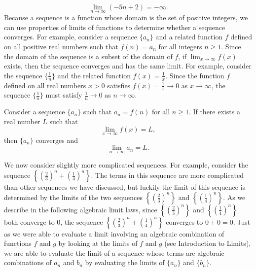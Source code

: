 \documentclass{report}
\begin{document}
    \[
    \lim_{{n \to \infty}} (-5n+2) = -\infty.
    \]
    \bigbreak \noindent 
    Because a sequence is a function whose domain is the set of positive integers, we can use properties of limits of functions to determine whether a sequence converges. For example, consider a sequence \( \{a_n\} \) and a related function \( f \) defined on all positive real numbers such that \( f(n) = a_n \) for all integers \( n \geq 1 \). Since the domain of the sequence is a subset of the domain of \( f \), if \( \lim_{{x \to \infty}} f(x) \) exists, then the sequence converges and has the same limit. For example, consider the sequence \( \{\frac{1}{n}\} \) and the related function \( f(x) = \frac{1}{x} \). Since the function \( f \) defined on all real numbers \( x > 0 \) satisfies \( f(x) = \frac{1}{x} \to 0 \) as \( x \to \infty \), the sequence \( \{\frac{1}{n}\} \) must satisfy \( \frac{1}{n} \to 0 \) as \( n \to \infty \).

    \bigbreak \noindent 
    \begin{thrm}
        Consider a sequence \( \{a_n\} \) such that \( a_n = f(n) \) for all \( n \geq 1 \). If there exists a real number \( L \) such that
        \[
        \lim_{{x \to \infty}} f(x) = L,
        \]
        then \( \{a_n\} \) converges and
        \[
        \lim_{{n \to \infty}} a_n = L.
        \]

        
    \end{thrm}

    \bigbreak \noindent 
      We now consider slightly more complicated sequences. For example, consider the sequence \( \left\{\left(\frac{2}{3}\right)^n + \left(\frac{1}{4}\right)^n\right\} \). The terms in this sequence are more complicated than other sequences we have discussed, but luckily the limit of this sequence is determined by the limits of the two sequences \( \left\{\left(\frac{2}{3}\right)^n\right\} \) and \( \left\{\left(\frac{1}{4}\right)^n\right\} \). As we describe in the following algebraic limit laws, since \( \left\{\left(\frac{2}{3}\right)^n\right\} \) and \( \left\{\left(\frac{1}{4}\right)^n\right\} \) both converge to 0, the sequence \( \left\{\left(\frac{2}{3}\right)^n + \left(\frac{1}{4}\right)^n\right\} \) converges to \( 0 + 0 = 0 \). Just as we were able to evaluate a limit involving an algebraic combination of functions \( f \) and \( g \) by looking at the limits of \( f \) and \( g \) (see Introduction to Limits), we are able to evaluate the limit of a sequence whose terms are algebraic combinations of \( a_n \) and \( b_n \) by evaluating the limits of \( \{a_n\} \) and \( \{b_n\} \).
\end{document}

